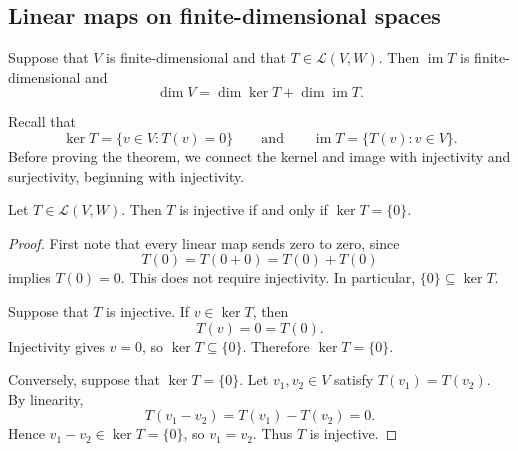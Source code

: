 \subsection{Linear maps on finite-dimensional spaces}

\begin{theorem}
  \label{thm:fundamental-linear-maps}
  Suppose that $V$ is finite-dimensional and that
  $T\in\mathcal L(V,W)$. Then $\operatorname{im}T$ is
  finite-dimensional and
  \[
    \dim V=\dim\ker T+\dim\operatorname{im}T.
  \]
\end{theorem}

Recall that
\[
  \ker T=\{v\in V:T(v)=0\}
  \qquad\text{and}\qquad
  \operatorname{im}T=\{T(v):v\in V\}.
\]
Before proving the theorem, we connect the kernel and image with
injectivity and surjectivity, beginning with injectivity.

\begin{proposition}\label{prop:injective-kernel}
  Let $T\in\mathcal L(V,W)$. Then $T$ is injective if and only if
  $\ker T=\{0\}$.
\end{proposition}

\begin{proof}
  First note that every linear map sends zero to zero, since
  \[
    T(0)=T(0+0)=T(0)+T(0)
  \]
  implies $T(0)=0$. This does not require injectivity. In particular,
  $\{0\}\subseteq\ker T$.

  Suppose that $T$ is injective. If $v\in\ker T$, then
  \[
    T(v)=0=T(0).
  \]
  Injectivity gives $v=0$, so $\ker T\subseteq\{0\}$. Therefore
  $\ker T=\{0\}$.

  Conversely, suppose that $\ker T=\{0\}$. Let $v_1,v_2\in V$ satisfy
  $T(v_1)=T(v_2)$. By linearity,
  \[
    T(v_1-v_2)=T(v_1)-T(v_2)=0.
  \]
  Hence $v_1-v_2\in\ker T=\{0\}$, so $v_1=v_2$. Thus $T$ is
  injective.
\end{proof}
